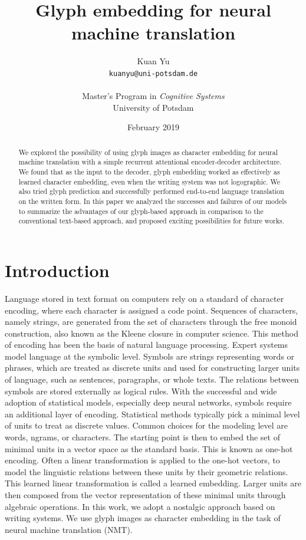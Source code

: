 \documentclass[11pt,twocolumn]{article}
\title{Glyph embedding for neural machine translation}
\author{%
  Kuan Yu\\
  \texttt{kuanyu@uni-potsdam.de}\\
  \\
  Master's Program in \emph{Cognitive Systems}\\
  University of Potsdam}
\date{February 2019}
\begin{document}
\maketitle

\begin{abstract}
  We explored the possibility of using glyph images as character embedding for neural machine translation
  with a simple recurrent attentional encoder-decoder architecture.
  We found that as the input to the decoder,
  glyph embedding worked as effectively as learned character embedding,
  even when the writing system was not logographic.
  We also tried glyph prediction and successfully performed end-to-end language translation on the written form.
  In this paper we analyzed the successes and failures of our models
  to summarize the advantages of our glyph-based approach
  in comparison to the conventional text-based approach,
  and proposed exciting possibilities for future works.
\end{abstract}

\section{Introduction}\label{sec:introduction}

Language stored in text format on computers rely on a standard of character encoding,
where each character is assigned a code point.
Sequences of characters, namely strings,
are generated from the set of characters through the free monoid construction,
also known as the Kleene closure in computer science.
This method of encoding has been the basis of natural language processing.
Expert systems model language at the symbolic level.
Symbols are strings representing words or phrases,
which are treated as discrete units and used for constructing larger units of language,
such as sentences, paragraphs, or whole texts.
The relations between symbols are stored externally as logical rules.
With the successful and wide adoption of statistical models,
especially deep neural networks,
symbols require an additional layer of encoding.
Statistical methods typically pick a minimal level of units to treat as discrete values.
Common choices for the modeling level are words, ngrams, or characters.
The starting point is then to embed the set of minimal units in a vector space as the standard basis.
This is known as one-hot encoding.
Often a linear transformation is applied to the one-hot vectors,
to model the linguistic relations between these units by their geometric relations.
This learned linear transformation is called a learned embedding.
Larger units are then composed from the vector representation of these minimal units through algebraic operations.
In this work, we adopt a nostalgic approach based on writing systems.
We use glyph images as character embedding in the task of neural machine translation (NMT).
\end{document}
